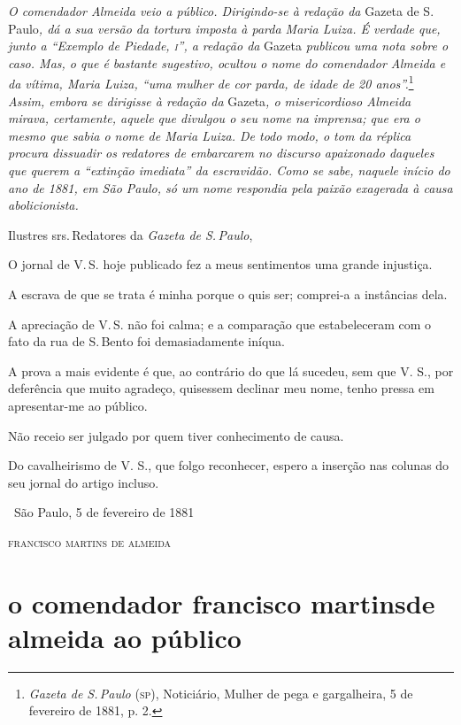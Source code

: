 \begin{resumo}
\emph{O comendador Almeida veio a público. Dirigindo-se à redação da}
Gazeta de S.\,Paulo\emph{, dá a sua versão da tortura imposta à parda
Maria Luiza. É verdade que, junto a ``Exemplo de Piedade, \textsc{i}'', a
redação da} Gazeta \emph{publicou uma nota sobre o caso. Mas, o que é
bastante sugestivo, ocultou o nome do comendador Almeida e da vítima,
Maria Luiza, ``uma mulher de cor parda, de idade de 20 anos''.}\footnote{
\emph{Gazeta de S.\,Paulo} (\textsc{sp}), Noticiário, Mulher de pega e
  gargalheira, 5 de fevereiro de 1881, p. 2.}
\emph{Assim, embora se
dirigisse à redação da} Gazeta\emph{, o misericordioso Almeida mirava,
certamente, aquele que divulgou o seu nome na imprensa; que era o mesmo
que sabia o nome de Maria Luiza. De todo modo, o tom da réplica procura
dissuadir os redatores de embarcarem no discurso apaixonado daqueles que
querem a ``extinção imediata'' da escravidão. Como se sabe, naquele início
do ano de 1881, em São Paulo, só um nome respondia pela paixão exagerada
à causa abolicionista. }
\end{resumo}

Ilustres srs.\,Redatores da \emph{Gazeta de S.\,Paulo},

O jornal de V.\,S. hoje publicado fez a meus sentimentos uma grande
injustiça.

A escrava de que se trata é minha porque o quis ser; comprei-a a
instâncias dela.

A apreciação de V.\,S. não foi calma; e a comparação que estabeleceram
com o fato da rua de S.\,Bento foi demasiadamente iníqua.

A prova a mais evidente é que, ao contrário do que lá sucedeu, sem que
V. S., por deferência que muito agradeço, quisessem declinar meu nome,
tenho pressa em apresentar-me ao público.

Não receio ser julgado por quem tiver conhecimento de causa.

Do cavalheirismo de V. S., que folgo reconhecer, espero a inserção nas
colunas do seu jornal do artigo incluso.

\medskip
\hfill\ São Paulo, 5 de fevereiro de 1881

\hfill\textsc{francisco martins de almeida}

\section*{o comendador francisco martins\break de almeida ao público}

